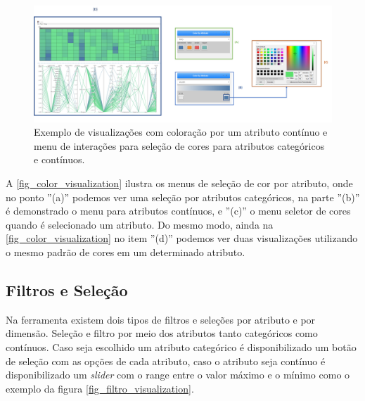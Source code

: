 \documentclass[
	12pt,				%
	openright,			%
	oneside,			%
	a4paper,			%
	english,			%
	brazil				%
	]{abntex2}
\begin{document}
\begin{figure}[!ht]
	\caption{\label{fig_color_visualization} Exemplo de visualizações com coloração por um atributo contínuo e menu de interações para seleção de cores para atributos categóricos e contínuos.
}
	\begin{center}
	    \includegraphics[width=\textwidth,scale=1]{figures/duas visualizações_2.png}
	\end{center}
\end{figure}

A \autoref{fig_color_visualization} ilustra os menus de seleção de cor por atributo, onde no ponto ''(a)'' podemos ver uma seleção por atributos categóricos, na parte ''(b)'' é demonstrado o menu para atributos contínuos, e ''(c)'' o menu seletor de cores quando é selecionado um atributo. Do mesmo modo, ainda na \autoref{fig_color_visualization} no item ''(d)'' podemos ver duas visualizações utilizando o mesmo padrão de cores em um determinado atributo.

\subsection{Filtros e Seleção}
Na ferramenta existem dois tipos de filtros e seleções por atributo e por dimensão. Seleção e filtro por meio dos atributos tanto categóricos como contínuos. Caso seja escolhido um atributo categórico é disponibilizado um botão de seleção com as opções de cada atributo, caso o atributo seja contínuo é disponibilizado um \textit{slider} com o range entre o valor máximo e o mínimo como o exemplo da figura \autoref{fig_filtro_visualization}.
\end{document}
